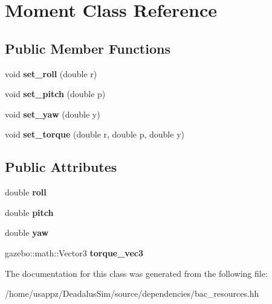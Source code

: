 \hypertarget{classMoment}{\section{\-Moment \-Class \-Reference}
\label{classMoment}
}
\subsection*{\-Public \-Member \-Functions}
\begin{DoxyCompactItemize}
\item 
\hypertarget{classMoment_a6cc6573470687827d0c9226f23cc2e56}{void {\bfseries set\-\_\-roll} (double r)}\label{classMoment_a6cc6573470687827d0c9226f23cc2e56}

\item 
\hypertarget{classMoment_a95fd178fefc2ea06d901648cf0cf053f}{void {\bfseries set\-\_\-pitch} (double p)}\label{classMoment_a95fd178fefc2ea06d901648cf0cf053f}

\item 
\hypertarget{classMoment_aa1e2fb78e28b6840f97903de37dc1700}{void {\bfseries set\-\_\-yaw} (double y)}\label{classMoment_aa1e2fb78e28b6840f97903de37dc1700}

\item 
\hypertarget{classMoment_a02a4e2cd7a08848d608092c9317cf5ff}{void {\bfseries set\-\_\-torque} (double r, double p, double y)}\label{classMoment_a02a4e2cd7a08848d608092c9317cf5ff}

\end{DoxyCompactItemize}
\subsection*{\-Public \-Attributes}
\begin{DoxyCompactItemize}
\item 
\hypertarget{classMoment_a382b944f178c6a9d1d0e338abeb8127a}{double {\bfseries roll}}\label{classMoment_a382b944f178c6a9d1d0e338abeb8127a}

\item 
\hypertarget{classMoment_a11a034232f238d3458685dc9f1b5c2fa}{double {\bfseries pitch}}\label{classMoment_a11a034232f238d3458685dc9f1b5c2fa}

\item 
\hypertarget{classMoment_a0557fafc6eac795d8f90e9f24fb7f911}{double {\bfseries yaw}}\label{classMoment_a0557fafc6eac795d8f90e9f24fb7f911}

\item 
\hypertarget{classMoment_ab75d9550401fe69d8f89c3d779c6cc50}{gazebo\-::math\-::\-Vector3 {\bfseries torque\-\_\-vec3}}\label{classMoment_ab75d9550401fe69d8f89c3d779c6cc50}

\end{DoxyCompactItemize}


\-The documentation for this class was generated from the following file\-:\begin{DoxyCompactItemize}
\item 
/home/usappz/\-Deadalus\-Sim/source/dependencies/bac\-\_\-resources.\-hh\end{DoxyCompactItemize}
